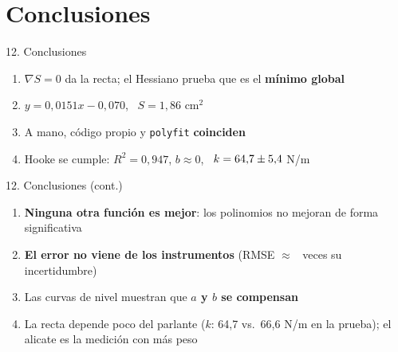 \documentclass[aspectratio=169,11pt]{beamer}
\begin{document}
\section{Conclusiones}

\begin{frame}{12. Conclusiones}
  \begin{enumerate}\itemsep6pt
    \item $\nabla S=0$ da la recta; el Hessiano prueba que es el \textbf{mínimo global}
    \item $y=0{,}0151x-0{,}070$, \ $S=1{,}86$ cm$^2$
    \item A mano, código propio y \texttt{polyfit} \textbf{coinciden}
    \item Hooke se cumple: $R^2=0{,}947$, $b\approx0$, \ $k=64{,}7\pm5{,}4$ N/m
  \end{enumerate}
\end{frame}

\begin{frame}{12. Conclusiones (cont.)}
  \begin{enumerate}\itemsep6pt\setcounter{enumi}{4}
    \item \textbf{Ninguna otra función es mejor}: los polinomios no mejoran de forma significativa
    \item \textbf{El error no viene de los instrumentos} (RMSE $\approx$ \vrazon\ veces su incertidumbre)
    \item Las curvas de nivel muestran que \textbf{$a$ y $b$ se compensan}
    \item La recta depende poco del parlante ($k$: 64,7 vs.\ 66,6 N/m en la prueba); el alicate es la medición con más peso
  \end{enumerate}
\end{frame}
\end{document}
